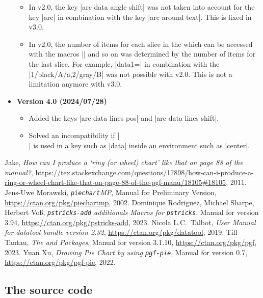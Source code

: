 \documentclass[a4paper,english,dvipsnames]{ltxdoc}
\begin{document}
\begin{itemize}
\begin{itemize}
\item In v2.0, the key |arc data angle shift| was not taken into account for the key |arc| in combination with the key |arc around text|. This is fixed in v3.0.
\item In v2.0, the number of items for each slice in the  which can be accessed with the macros |\WCvarA| and so on was determined by the number of items for the last slice. For example, |data{1}=\WCvarD| in combination with the  |1/black/A/a,2/gray/B| was not possible with v2.0. This is not a limitation anymore with v3.0.
\end{itemize}
\item[] \textbf{Version 4.0 (2024/07/28)}
\begin{itemize}
\item Added the keys |arc data lines pos| and |arc data lines shift|.
\item Solved an incompatibility if |\\| is used in a key such as |data| inside an environment such as |center|.
\end{itemize}
\end{itemize}
\begin{thebibliography}{9}
Jake,
\emph{How can I produce a `ring (or wheel) chart' like that on page 88 of the {\upshape\pgfname} manual?},
\url{https://tex.stackexchange.com/questions/17898/how-can-i-produce-a-ring-or-wheel-chart-like-that-on-page-88-of-the-pgf-manu/18105#18105},
2011.
Jens-Uwe Morawski,
\emph{{\upshape\texttt{piechart}\textsf{MP}}},
Manual for Preliminary Version,
\url{https://ctan.org/pkg/piechartmp},
2002.
Dominique Rodriguez, Michael Sharpe, Herbert Vo{\ss},
\emph{{\upshape\texttt{pstricks-add} \textsf{additionals Macros for} \texttt{pstricks}}},
Manual for version 3.94,
\url{https://ctan.org/pkg/pstricks-add},
2023.
Nicola L.C.~Talbot,
\emph{User Manual for datatool bundle version 2.32},
\url{https://ctan.org/pkg/datatool},
2019.
Till Tantau,
\emph{The \tikzname{} and {\upshape\pgfname} Packages},
Manual for version 3.1.10,
\url{https://ctan.org/pkg/pgf},
2023.
Yuan Xu,
\emph{Drawing Pie Chart by using {\upshape\texttt{pgf-pie}}},
Manual for version 0.7,
\url{https://ctan.org/pkg/pgf-pie},
2022.
\end{thebibliography}
\printindex
{}
\pagestyle{plain}
\appendix
{}
\begin{landscape}
\section{The source code}\label{Thesourcecode}
\end{landscape}
\end{document}
